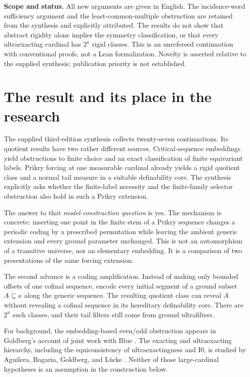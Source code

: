 \documentclass[11pt,letterpaper]{article}
\theoremstyle{definition}
\numberwithin{equation}{section}
\begin{document}
\textbf{Scope and status.} All new arguments are given in English. The incidence-word sufficiency argument and the least-common-multiple obstruction are retained from the synthesis and explicitly attributed. The results do not show that abstract rigidity alone implies the symmetry classification, or that every ultraexacting cardinal has $2^\kappa$ rigid classes. This is an unrefereed continuation with conventional proofs, not a Lean formalization. Novelty is asserted relative to the supplied synthesis; publication priority is not established.

\newpage
\tableofcontents

\newpage
\section{The result and its place in the research}
\label{sec:main}

The supplied third-edition synthesis \cite{synthesis} collects twenty-seven continuations. Its quotient results have two rather different sources. Critical-sequence embeddings yield obstructions to finite choice and an exact classification of finite equivariant labels. Prikry forcing at one measurable cardinal already yields a rigid quotient class and a normal tail measure in a suitable definability core. The synthesis explicitly asks whether the finite-label necessity and the finite-family selector obstruction also hold in such a Prikry extension.

The answer to that \emph{model-construction question} is yes. The mechanism is concrete: inserting one point in the finite stem of a Prikry sequence changes a periodic coding by a prescribed permutation while leaving the ambient generic extension and every ground parameter unchanged. This is not an automorphism of a transitive universe, nor an elementary embedding. It is a comparison of two presentations of the same forcing extension.

The second advance is a coding amplification. Instead of making only bounded offsets of one cofinal sequence, encode every initial segment of a ground subset $A\subseteq\kappa$ along the generic sequence. The resulting quotient class can reveal $A$ without revealing a cofinal sequence in its hereditary definability core. There are $2^\kappa$ such classes, and their tail filters still come from ground ultrafilters.

For background, the embedding-based even/odd obstruction appears in Goldberg's account of joint work with Blue \cite[Remark~2.4]{goldberg}. The exacting and ultraexacting hierarchy, including the equiconsistency of ultraexactingness and $\mathrm{I0}$, is studied by Aguilera, Bagaria, Goldberg, and L\"ucke \cite{abgl}. Neither of those large-cardinal hypotheses is an assumption in the construction below.
\end{document}
